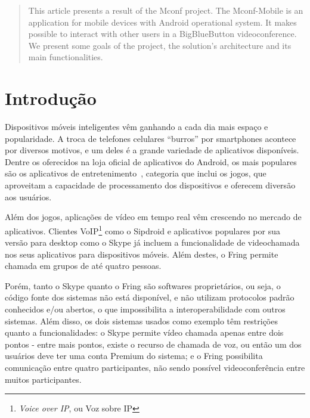 \documentclass{acm_proc_article-sp}
\begin{document}
\begin{abstract}
  This article presents a result of the Mconf project. The Mconf-Mobile is an application for mobile devices with Android operational system. It makes possible to interact with other users in a BigBlueButton videoconference. We present some goals of the project, the solution's architecture and its main functionalities.
\end{abstract}






\section{Introdução}

Dispositivos móveis inteligentes vêm ganhando a cada dia mais espaço e popularidade. A troca de telefones celulares ``burros'' por smartphones acontece por diversos motivos, e um deles é a grande variedade de aplicativos disponíveis. Dentre os oferecidos na loja oficial de aplicativos do Android, os mais populares são os aplicativos de entretenimento~\cite{android-stats}, categoria que inclui os jogos, que aproveitam a capacidade de processamento dos dispositivos e oferecem diversão aos usuários.

Além dos jogos, aplicações de vídeo em tempo real vêm crescendo no mercado de aplicativos. Clientes VoIP\footnote{\emph{Voice over IP}, ou Voz sobre IP} como o Sipdroid e aplicativos populares por sua versão para desktop como o Skype já incluem a funcionalidade de videochamada nos seus aplicativos para dispositivos móveis. Além destes, o Fring permite chamada em grupos de até quatro pessoas.

Porém, tanto o Skype quanto o Fring são softwares proprietários, ou seja, o código fonte dos sistemas não está disponível, e não utilizam protocolos padrão conhecidos e/ou abertos, o que impossibilita a interoperabilidade com outros sistemas. Além disso, os dois sistemas usados como exemplo têm restrições quanto a funcionalidades: o Skype permite vídeo chamada apenas entre dois pontos - entre mais pontos, existe o recurso de chamada de voz, ou então um dos usuários deve ter uma conta Premium do sistema; e o Fring possibilita comunicação entre quatro participantes, não sendo possível videoconferência entre muitos participantes.
\end{document}
